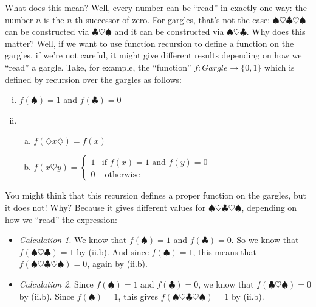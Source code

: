 \begin{enumerate}[{\thesection}.1]
		
		What does this mean? Well, every number can be ``read'' in exactly one way: the number $n$ is the $n$-th successor of zero. For gargles, that's not the case: $\spadesuit\heartsuit\clubsuit\heartsuit\spadesuit$ can be constructed via $\clubsuit\heartsuit\spadesuit$ and it can be constructed via $\spadesuit\heartsuit\clubsuit$. Why does this matter? Well, if we want to use function recursion to define a function on the gargles, if we're not careful, it might give different results depending on how we ``read'' a gargle. Take, for example, the ``function'' $f:Gargle\to\{0,1\}$ which is defined by recursion over the gargles as follows:
		\begin{enumerate}[(i)]
		
			\item $f(\spadesuit)=1$ and $f(\clubsuit)=0$
			
			\item \begin{enumerate}[(a)]
			
				\item $f(\diamondsuit x\diamondsuit)=f(x)$
				
				\item $f(x\heartsuit y)=\begin{cases}
			1 & \text{if }f(x)=1\text{ and }f(y)=0\\
			0 &\text{ otherwise}
			\end{cases}$
			
			\end{enumerate}
		
		\end{enumerate}
You might think that this recursion defines a proper function on the gargles, but it does not! Why? Because it gives different values for  $\spadesuit\heartsuit\clubsuit\heartsuit\spadesuit$, depending on how we ``read'' the expression:

		\begin{itemize}
		
			\item \emph{Calculation 1}. We know that $f(\spadesuit)=1$ and $f(\clubsuit)=0$. So we know that $f(\spadesuit\heartsuit\clubsuit)=1$ by (ii.b). And since $f(\spadesuit)=1$, this means that $f(\spadesuit\heartsuit\clubsuit\heartsuit\spadesuit)=0$, again by (ii.b).
						
			\item  \emph{Calculation 2}. Since $f(\spadesuit)=1$ and $f(\clubsuit)=0$, we know that $f(\clubsuit\heartsuit\spadesuit)=0$ by (ii.b). Since $f(\spadesuit)=1$, this gives $f(\spadesuit\heartsuit\clubsuit\heartsuit\spadesuit)=1$ by (ii.b).


\end{itemize}
\end{enumerate}
